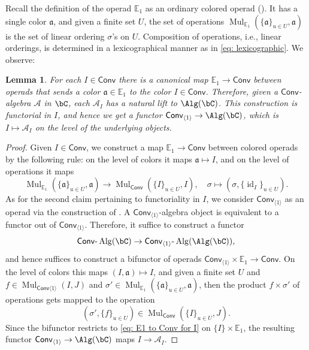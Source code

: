 \documentclass[10pt]{amsart}
\newcommand{\sssec}{\subsubsection}
\newtheorem{lemma}[subsubsection]{Lemma}
\theoremstyle{remark}
\newcommand{\mf}[1]{\mathfrak{#1}}
\newcommand{\E}{\mathbb{E}}
\newcommand{\on}{\operatorname}
\newcommand{\cA}{\mathcal{A}}
\newcommand{\lAlg}{\text{-}\on{Alg}}
\newcommand{\id}{\on{id}}
\newcommand{\Mul}{\on{Mul}}
\newcommand{\Conv}{\mathsf{Conv}}
\begin{document}
\sssec{}
Recall the definition of the operad $\E_1$ as an ordinary colored operad (\cite[Definition 4.1.1.1]{HA}). It has a single color $\mf{a}$, and given a finite set $U$, the set of operations $\Mul_{\E_1}(\{\mf{a}\}_{u\in U},\mf{a})$ is the set of linear ordering $\sigma$'s on $U$. Composition of operations, i.e., linear orderings, is determined in a lexicographical manner as in \eqref{eq: lexicographic}. We observe:

\begin{lemma}\label{lem: Conv and E1}
    For each $I\in\Conv$ there is a canonical map $\E_1\rightarrow \Conv$ between operads that sends a color $\mf{a}\in \E_1$ to the color $I\in\Conv$. Therefore, given a $\Conv$-algebra $\cA$ in $\bC$, each $\cA_I$ has a natural lift to $\Alg(\bC)$. This construction is functorial in $I$, and hence we get a functor $\Conv_{\langle 1\rangle}\rightarrow \Alg(\bC)$, which is $I\mapsto \cA_I$ on the level of the underlying objects.
\end{lemma}
\begin{proof}
    Given $I\in\Conv$, we construct a map $\E_1\rightarrow\Conv$ between colored operads by the following rule: on the level of colors it maps $\mf{a}\mapsto I$, and on the level of operations it maps
    \begin{equation}\label{eq: E1 to Conv for I}
        \Mul_{\E_1}(\{\mf{a}\}_{u\in U},\mf{a})\rightarrow \Mul_{\Conv}(\{I\}_{u\in U},I),\quad \sigma\mapsto (\sigma,\{\id_I\}_{u\in U}).
    \end{equation}
    As for the second claim pertaining to functoriality in $I$, we consider $\Conv_{\langle 1\rangle}$ as an operad via the construction of \cite[Remark 2.1.1.4]{HA}. A $\Conv_{\langle 1\rangle}$-algebra object is equivalent to a functor out of $\Conv_{\langle 1\rangle}$. Therefore, it suffice to construct a functor
    \[\Conv\lAlg(\bC)\rightarrow\Conv_{\langle 1\rangle}\lAlg(\Alg(\bC)),\]
    and hence suffices to construct a bifunctor of operads
    $\Conv_{\langle 1\rangle}\times \E_1\rightarrow \Conv$.
    On the level of colors this maps $(I,\mf{a})\mapsto I$, and given a finite set $U$ and $f\in\Mul_{\Conv\langle 1\rangle}(I, J)$ and $\sigma'\in\Mul_{\E_1}(\{\mf{a}\}_{u\in U},\mf{a})$, then the product $f\times \sigma'$ of operations gets mapped to the operation
    \[(\sigma', \{f\}_{u\in U})\in \Mul_{\Conv}(\{I\}_{u\in U}, J).\]
    Since the bifunctor restricts to \eqref{eq: E1 to Conv for I} on $\{I\}\times\E_1$, the resulting functor $\Conv_{\langle 1\rangle}\rightarrow \Alg(\bC)$ maps $I\rightarrow\cA_I$.
\end{proof}
\end{document}
